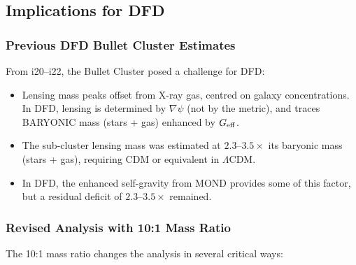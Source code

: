 \documentclass[11pt]{article}
\newcommand{\LCDM}{$\Lambda$CDM}
\newcommand{\Geff}{G_{\rm eff}}
\begin{document}
\subsection{Implications for DFD}

\subsubsection{Previous DFD Bullet Cluster Estimates}

From i20--i22, the Bullet Cluster posed a challenge for DFD:
\begin{itemize}
\item Lensing mass peaks offset from X-ray gas, centred on galaxy
  concentrations.  In DFD, lensing is determined by $\nabla\psi$ (not
  by the metric), and traces BARYONIC mass (stars + gas) enhanced by
  $\Geff$.
\item The sub-cluster lensing mass was estimated at $2.3$--$3.5\times$
  its baryonic mass (stars + gas), requiring CDM or equivalent in
  \LCDM.
\item In DFD, the enhanced self-gravity from MOND provides some of
  this factor, but a residual deficit of $2.3$--$3.5\times$ remained.
\end{itemize}

\subsubsection{Revised Analysis with 10:1 Mass Ratio}

The 10:1 mass ratio changes the analysis in several critical ways:
\end{document}
